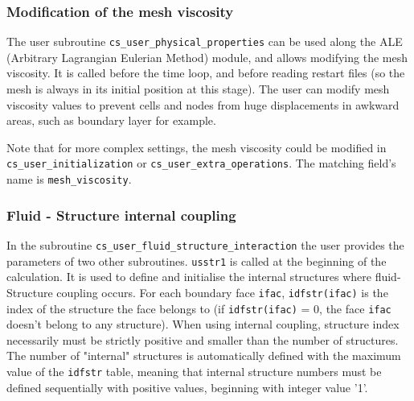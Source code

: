 {{%
\subsubsection{Modification of the mesh viscosity}

The user subroutine \texttt{cs\_user\_physical\_properties} can be used along the ALE (Arbitrary Lagrangian Eulerian
 Method) module, and allows modifying the mesh viscosity.
 It is called before the time loop, and before reading restart files
 (so the mesh is always in its initial position at this stage).
The user can modify mesh viscosity values to prevent cells and nodes from huge
 displacements in awkward areas, such as boundary layer for example.

Note that for more complex settings, the mesh viscosity could be modified in
 \texttt{cs\_user\_initialization} or \texttt{cs\_user\_extra\_operations}.
 The matching field's name is \texttt{mesh\_viscosity}.

\subsubsection{Fluid - Structure internal coupling}\label{sec:ALE}

In the subroutine \texttt{cs\_user\_fluid\_structure\_interaction} the user provides the parameters of two other subroutines.
\texttt{usstr1} is called at the beginning of the calculation. It is used to define
 and initialise the internal structures where fluid-Structure coupling occurs.
For each boundary face \texttt{ifac}, \texttt{idfstr(ifac)} is the index of the structure
 the face belongs to (if \texttt{idfstr(ifac)} = 0, the face \texttt{ifac} doesn't belong
 to any structure). When using internal coupling, structure index necessarily must be
 strictly positive and smaller than the number of structures. The number of "internal" structures is automatically defined with the maximum
 value of the \texttt{idfstr} table, meaning that internal structure numbers must be defined
 sequentially with positive values, beginning with integer value '1'.

}}
